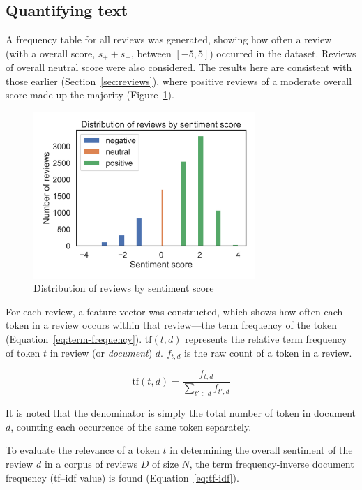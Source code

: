 \documentclass[12pt, a4paper]{pancake-article}
\begin{document}
\subsection{Quantifying text}

A frequency table for all reviews was generated, showing how
often a review (with a overall score, \(s_+ + s_-\), between \(\left[-5, 5\right]\))
occurred in the dataset. Reviews of overall neutral score were also considered.
The results here are consistent with those earlier (Section~\ref{sec:reviews}),
where positive reviews of a moderate overall score made up the majority (Figure~\ref{fig:distribution}).

\begin{figure}[htpb]
	\centering
	\includegraphics[width=0.75\textwidth]{../results/old/distribution.png}
	\caption{Distribution of reviews by sentiment score}
	\label{fig:distribution}
\end{figure}

For each review, a feature vector was constructed, which shows how
often each token in a review occurs within that review---the term frequency
of the token (Equation~\ref{eq:term-frequency}). \(\text{tf}\left(t, d\right)\)
represents the relative term frequency of token \(t\) in review (or \textit{document})
\(d\). \(f_{t, d}\) is the raw count of a token in a review.

\begin{equation}
	\text{tf}\left(t, d\right) = \frac{f_{t, d}}{\sum_{t' \in d}^{}f_{t',d}}
	\label{eq:term-frequency}
\end{equation}

It is noted that the denominator is simply the total number of token in document \(d\),
counting each occurrence of the same token separately.

To evaluate the relevance of a token \(t\) in determining the overall sentiment of the
review \(d\) in a corpus of reviews \(D\) of size \(N\), the term frequency-inverse document frequency
(tf--idf value) is found (Equation~\ref{eq:tf-idf}).
\end{document}
